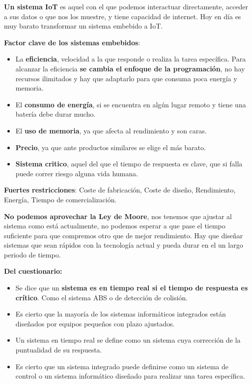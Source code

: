 \documentclass[12pt]{report} %
\begin{document}
\textbf{Un sistema IoT} es aquel con el que podemos interactuar
directamente, acceder a sus datos o que nos los muestre, y tiene
capacidad de internet. Hoy en día es muy barato transformar un sistema
embebido a IoT.

\textbf{Factor clave de los sistemas embebidos}:

\begin{itemize}

\item
  La \textbf{eficiencia}, velocidad a la que responde o realiza la tarea
  específica. Para alcanzar la eficiencia \textbf{se cambia el enfoque
  de la programación}, no hay recursos ilimitados y hay que adaptarlo
  para que consuma poca energía y memoria.
\item
  El \textbf{consumo de energía}, si se encuentra en algún lugar remoto
  y tiene una batería debe durar mucho.
\item
  El \textbf{uso de memoria}, ya que afecta al rendimiento y son caras.
\item
  \textbf{Precio}, ya que ante productos similares se elige el más
  barato.
\item
  \textbf{Sistema critico}, aquel del que el tiempo de respuesta es
  clave, que si falla puede correr riesgo alguna vida humana.
\end{itemize}

\textbf{Fuertes restricciones}: Coste de fabricación, Coste de diseño, Rendimiento, Energía, Tiempo de comercialización.

\textbf{No podemos aprovechar la Ley de Moore}, nos tenemos que ajustar
al sistema como está actualmente, no podemos esperar a que pase el
tiempo suficiente para que compremos otro que de mejor rendimiento. Hay
que diseñar sistemas que sean rápidos con la tecnología actual y pueda
durar en el un largo periodo de tiempo.

\textbf{Del cuestionario:}

\begin{itemize}

\item
  Se dice que un \textbf{sistema es en tiempo real si el tiempo de
  respuesta es crítico}. Como el sistema ABS o de detección de colisión.
\item
  Es cierto que la mayoría de los sistemas informáticos integrados están
  diseñados por equipos pequeños con plazo ajustados.
\item
  Un sistema en tiempo real se define como un sistema cuya corrección de
  la puntualidad de su respuesta.
\item
  Es cierto que un sistema integrado puede definirse como un sistema de
  control o un sistema informático diseñado para realizar una tarea
  específica.
\end{itemize}
\end{document}
